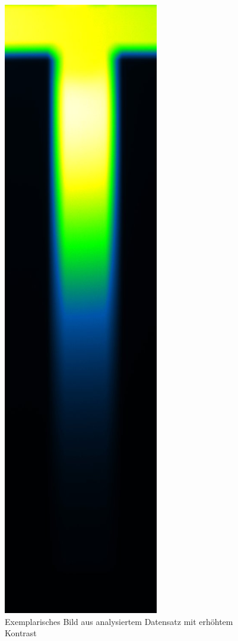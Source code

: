 \documentclass[11pt, a4paper]{article}
\begin{document}
\begin{figure}
    \centering
    \includegraphics[scale = 0.11]{Daten_t10_c02.jpg}
    \caption{Exemplarisches Bild aus analysiertem Datensatz mit erhöhtem Kontrast}
    \label{fig:MC_contrast}
\end{figure}
\end{document}
